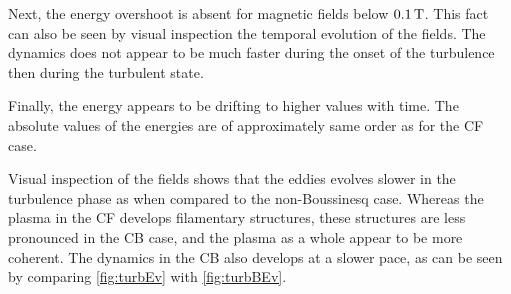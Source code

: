 Next, the energy overshoot is absent for magnetic fields below $0.1\, \text{T}$.
This fact can also be seen by visual inspection the temporal evolution of the fields.
The dynamics does not appear to be much faster during the onset of the turbulence then during the turbulent state.

Finally, the energy appears to be drifting to higher values with time.
The absolute values of the energies are of approximately same order as for the CF case.

Visual inspection of the fields shows that the eddies evolves slower in the turbulence phase as when compared to the non-Boussinesq case.
Whereas the plasma in the CF develops filamentary structures, these structures are less pronounced in the CB case, and the plasma as a whole appear to be more coherent.
The dynamics in the CB also develops at a slower pace, as can be seen by comparing \cref{fig:turbEv} with \cref{fig:turbBEv}.
%
